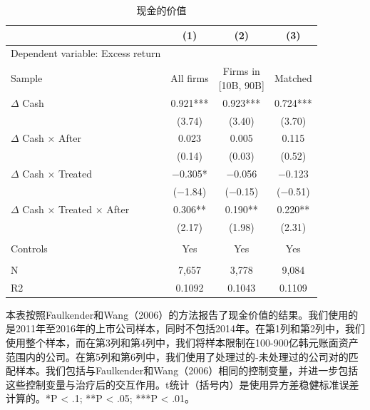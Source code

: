 \documentclass{article}
\begin{document}
\begin{table}[H]
\caption{现金的价值}
\centering
\begin{tabular}{lccc}
\toprule
                                    & (1)       & (2)                     & (3)      \\ \midrule
Dependent   variable: Excess return &           &                         &          \\ \midrule
Sample                              & All firms & \makecell[c]{Firms in \\ {[}10B, 90B{]}} & Matched  \\ \midrule
$\Delta$ Cash                               & 0.921***  & 0.923***                & 0.724*** \\
                                    & (3.74)    & (3.40)                  & (3.70)   \\
$\Delta$ Cash × After                       & 0.023     & 0.005                   & 0.115    \\
                                    & (0.14)    & (0.03)                  & (0.52)   \\
$\Delta$ Cash × Treated                     & −0.305*   & −0.056                  & −0.123   \\
                                    & (−1.84)   & (−0.15)                 & (−0.51)  \\
$\Delta$ Cash × Treated × After             & 0.306**   & 0.190**                 & 0.220**  \\
                                    & (2.17)    & (1.98)                  & (2.31)   \\
                                    &           &                         &          \\
Controls                            & Yes       & Yes                     & Yes      \\
                                    &           &                         &          \\
N                                   & 7,657     & 3,778                   & 9,084    \\
R2                                  & 0.1092    & 0.1043                  & 0.1109   \\ \bottomrule
\end{tabular}
\begin{tablenotes}
\footnotesize
    \item 本表按照Faulkender和Wang（2006）的方法报告了现金价值的结果。我们使用的是2011年至2016年的上市公司样本，同时不包括2014年。在第1列和第2列中，我们使用整个样本，而在第3列和第4列中，我们将样本限制在100-900亿韩元账面资产范围内的公司。在第5列和第6列中，我们使用了处理过的-未处理过的公司对的匹配样本。我们包括与Faulkender和Wang（2006）相同的控制变量，并进一步包括这些控制变量与治疗后的交互作用。t统计（括号内）是使用异方差稳健标准误差计算的。*P < .1; **P < .05; ***P < .01。
\end{tablenotes}
\end{table}
\end{document}
